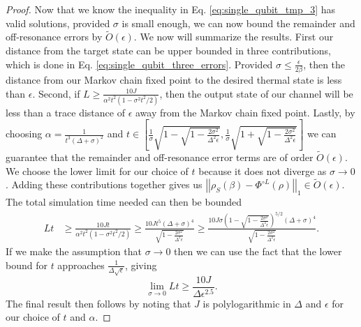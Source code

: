 \documentclass[
 amsmath,amssymb,
 aps,
onecolumn, 
nofootinbib]{revtex4-2}
\newcommand{\norm}[1]{\left|\left| #1 \right|\right|}
\newcommand{\bigotilde}[1]{\widetilde{O} \left( #1 \right)}
\begin{document}
\begin{proof}
Now that we know the inequality in Eq. \eqref{eq:single_qubit_tmp_3} has valid solutions, provided $\sigma$ is small enough, we can now bound the remainder and off-resonance errors by $\bigotilde{\epsilon}$. 
We now will summarize the results. First our distance from the target state can be upper bounded in three contributions, which is done in Eq. \eqref{eq:single_qubit_three_errors}.
Provided $\sigma \le \frac{\epsilon}{2 \beta}$, then the distance from our Markov chain fixed point to the desired thermal state is less than $\epsilon$. Second, if $L \ge \frac{10 J}{\alpha^2 t^2(1 - \sigma^2 t^2 /2) }$, then the output state of our channel will be less than a trace distance of $\epsilon$ away from the Markov chain fixed point. Lastly, by choosing $\alpha  = \frac{1}{t^3(\Delta + \sigma)^2}$ and $t \in \left[ \frac{1}{\sigma}\sqrt{1 - \sqrt{1 - \frac{2 \sigma^2}{\Delta^2 \epsilon}} }, \frac{1}{\sigma}\sqrt{1 + \sqrt{1 - \frac{2 \sigma^2}{\Delta^2 \epsilon}} } \right]$ we can guarantee that the remainder and off-resonance error terms are of order $\bigotilde{\epsilon}$.  We choose the lower limit for our choice of $t$ because it does not diverge as $\sigma\rightarrow 0$.  Adding these contributions together gives us $\norm{\rho_S(\beta) - \Phi^{\circ L }(\rho)}_1 \in \bigotilde{\epsilon}$. The total simulation time needed can then be bounded
\begin{align}
    Lt &\ge \frac{10 J t}{\alpha^2 t^2 (1 - \sigma^2 t^2 / 2)} \ge \frac{10 J t^5 (\Delta + \sigma)^4}{\sqrt{1 - \frac{2 \sigma^2}{\Delta^2 \epsilon}}} \ge \frac{10 J \sigma \left( 1 - \sqrt{1 - \frac{2 \sigma^2}{\Delta^2 \epsilon}}\right)^{5/2} (\Delta + \sigma)^4}{\sqrt{1 - \frac{2 \sigma^2}{\Delta^2 \epsilon}}}.
\end{align}
If we make the assumption that $\sigma \to 0$ then we can use the fact that the lower bound for $t$ approaches $\frac{1}{\Delta \sqrt{\epsilon}}$, giving
\begin{equation}
    \lim_{\sigma \to 0} Lt \ge \frac{10 J}{\Delta \epsilon^{2.5}}.
\end{equation}
The final result then follows by noting that $J$ is polylogarithmic in $\Delta$ and $\epsilon$ for our choice of $t$ and $\alpha$.
 \end{proof}
\end{document}
